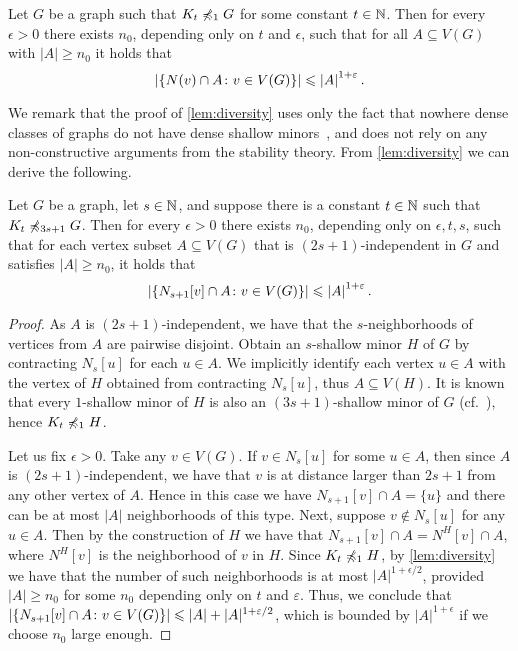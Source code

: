 \begin{lemma}\label{lem:diversity}
Let $G$ be a graph such that $K_t\not\preccurlyeq_{1} G$ for some constant $t\in \mathbb{N}$. 
Then for every $\epsilon>0$ there exists $n_0$, depending only on $t$ and $\epsilon$, such that for all $A\subseteq V(G)$ with $|A|\geq n_0$ it holds that
\[\left\lvert\{N(v)\cap A \colon v\in V(G)\}\right\rvert\leqslant\left\lvert A\right\rvert^{1+\varepsilon}.\]
\end{lemma}

We remark that the proof of \cref{lem:diversity} uses only the fact that
nowhere dense classes of graphs do not have dense 
shallow minors~\cite{dvorak2007asymptotical,jiang2011compact}, and does not rely on any non-constructive arguments from the stability theory.
From \cref{lem:diversity} we can derive the following.

\begin{corollary}\label{lem:gajarsky}
Let $G$ be a graph, let $s\in \mathbb{N}$, and suppose there is a constant $t\in \mathbb{N}$ such that $K_t\not\preccurlyeq_{3s+1} G$.
Then for every $\epsilon>0$ there exists $n_0$, depending only on $\epsilon,t,s$, such that for each vertex subset $A\subseteq V(G)$ that is $(2s+1)$-independent in $G$ and satisfies $|A|\geq n_0$, it holds that 
\[\left\lvert\{N_{s+1}[v]\cap A \colon v\in V(G)\}\right\rvert\leqslant\left\lvert A\right\rvert^{1+\varepsilon}.\]
\end{corollary}
\begin{proof}
As $A$ is $(2s+1)$-independent, we have that the $s$-neighborhoods of vertices from $A$ are pairwise disjoint.
Obtain an $s$-shallow minor $H$ of $G$ by contracting $N_s[u]$ for each $u\in A$. 
We implicitly identify each vertex $u\in A$ with the vertex of $H$ obtained from contracting $N_s[u]$, thus $A\subseteq V(H)$.
It is known that every $1$-shallow minor of $H$ is also an $(3s+1)$-shallow minor of $G$ (cf.~\cite[Proposition~4.1]{sparsity}), hence $K_t\not\preccurlyeq_{1} H$.

Let us fix $\epsilon>0$.
Take any $v\in V(G)$. If $v\in N_s[u]$ for some $u\in A$, then since $A$ is $(2s+1)$-independent, we have that $v$ is at distance larger than $2s+1$ from any other vertex of $A$.
Hence in this case we have $N_{s+1}[v]\cap A=\{u\}$ and there can be at most $|A|$ neighborhoods of this type.
Next, suppose $v\notin N_s[u]$ for any $u\in A$. Then by the construction of $H$ we have that $N_{s+1}[v]\cap A=N^H[v]\cap A$, where $N^H[v]$ is the neighborhood of $v$ in $H$.
Since $K_t\not\preccurlyeq_{1} H$, by \cref{lem:diversity} we have that the number of such neighborhoods is at most $|A|^{1+\epsilon/2}$,
provided $|A|\geq n_0$ for some $n_0$ depending only on $t$ and $\varepsilon$.
Thus, we conclude that $\left\lvert\{N_{s+1}[v]\cap A \colon v\in V(G)\}\right\rvert\leqslant |A|+|A|^{1+\varepsilon/2}$, which is bounded by $|A|^{1+\epsilon}$ if we choose $n_0$ large enough.
\end{proof}

